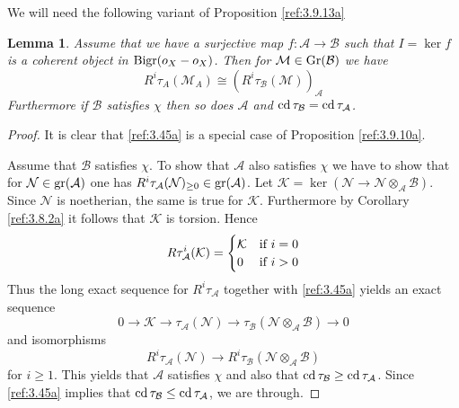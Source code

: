 \documentclass{amsproc}
\def\Ascr{{\mathcal A}}
\def\Bscr{{\mathcal B}}
\def\Kscr{{\mathcal K}}
\def\Mscr{{\mathcal M}}
\def\Nscr{{\mathcal N}}
\def\cd{\mathop{\text{cd}}}
\def\gr{\mathop{\text{gr}}}
\def\Gr{\mathop{\text{Gr}}}
\def\Bigr{\mathop{\text{Bigr}}}
\def\gr{\operatorname {gr}}
\def\ker{\operatorname {ker}}
\def\gr{\operatorname {gr}}
\def\r{\rightarrow}
\let\oldtext\text
\def\text#1{\oldtext{\upshape #1}}
\newtheorem{lemmas}{Lemma}[subsection]
\theoremstyle{definition}
\theoremstyle{remark}
\numberwithin{equation}{section}
\numberwithin{table}{section}
\numberwithin{figure}{section}
\def\gr{\mathop{\text{gr}}}
\def\Gr{\mathop{\text{Gr}}}
\begin{document}
We will need the following variant of Proposition \ref{ref:3.9.13a}
\begin{lemmas}
\label{ref:3.9.16a}
 Assume that we have a surjective map $f:\Ascr\r \Bscr$ such
that $I= \ker f$ is a coherent object in
$\Bigr(o_X-o_X)$.
Then for $\Mscr\in\Gr(\Bscr)$ we have
\begin{equation}
\label{ref:3.45a}
R^i\tau_A(\Mscr_A)\cong (R^i\tau_\Bscr(\Mscr))_\Ascr
\end{equation}
Furthermore if $\Bscr$ satisfies $\chi$ then so does $\Ascr$ and $\cd
\tau_\Bscr=\cd \tau_\Ascr$.
\end{lemmas}
\begin{proof}
  It is clear that \eqref{ref:3.45a} is a special case of 
  Proposition \ref{ref:3.9.10a}.

  Assume that $\Bscr$ satisfies $\chi$. To show that $\Ascr$ also
  satisfies $\chi$ we have to show that for $\Nscr\in\gr(\Ascr)$ one
  has $R^i\tau_\Ascr(\Nscr)_{\ge 0}\in\gr(\Ascr)$.  Let
  $\Kscr=\ker(\Nscr\r \Nscr\otimes_\Ascr\Bscr)$. Since $\Nscr$ is
  noetherian, the same is true for $\Kscr$. Furthermore by Corollary
  \ref{ref:3.8.2a} it follows that $\Kscr$ is torsion.  Hence
\[
R\tau^i_\Ascr(\Kscr)=
\begin{cases} \Kscr&\text{if $i=0$}\\
0&\text{if $i>0$}
\end{cases}
\]
Thus the long exact sequence for $R^i\tau_\Ascr$ together with
\eqref{ref:3.45a} yields an exact sequence
\[
0\r \Kscr
\r \tau_\Ascr(\Nscr)\r \tau_\Bscr(\Nscr\otimes_\Ascr\Bscr)\r 0
\]
and isomorphisms
\[
R^i\tau_\Ascr(\Nscr)\r R^i\tau_\Bscr(\Nscr\otimes_\Ascr\Bscr)
\]
for $i\ge 1$. This yields that $\Ascr$ satisfies $\chi$ and also that
$\cd\tau_\Bscr\ge \cd \tau_\Ascr$. Since \eqref{ref:3.45a} implies that
$\cd\tau_\Bscr\le \cd \tau_\Ascr$, we are through.
 \end{proof}
\end{document}
